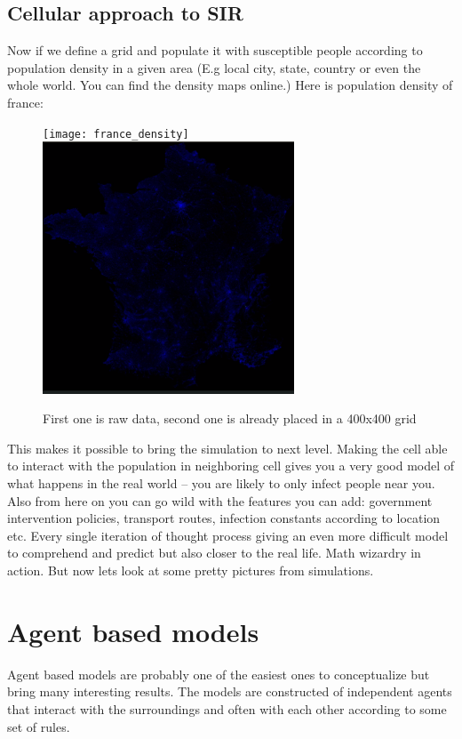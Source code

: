 \documentclass[pdftex, 12pt, a4paper]{report}
\begin{document}
	\subsection{Cellular approach to SIR}
	
	Now if we define a grid and populate it with susceptible people according to population density in a given area (E.g local city, state, country or even the whole world. You can find the density maps online.) Here is population density of france: 
	
	\begin{figure}[H]
		\centering
		\texttt{[image: france\_density]}
		\includegraphics[width=7.5cm, height=7.5cm]{france_density_SIR}
		\caption{First one is raw data, second one is already placed in a 400x400 grid}
	\end{figure}
	 This makes it possible to bring the simulation to next level. Making the cell able to interact with the population in neighboring cell gives you a very good model of what happens in the real world -- you are likely to only infect people near you. Also from here on you can go wild with the features you can add: government intervention policies, transport routes, infection constants according to location etc. Every single iteration of thought process giving an even more difficult model to comprehend and predict but also closer to the real life. Math wizardry in action. But now lets look at some pretty pictures from simulations.
	\section{Agent based models}
	
	Agent based models are probably one of the easiest ones to conceptualize but bring many interesting results. The models are constructed of independent agents that interact with the surroundings and often with each other according to some set of rules.
	
\end{document}
